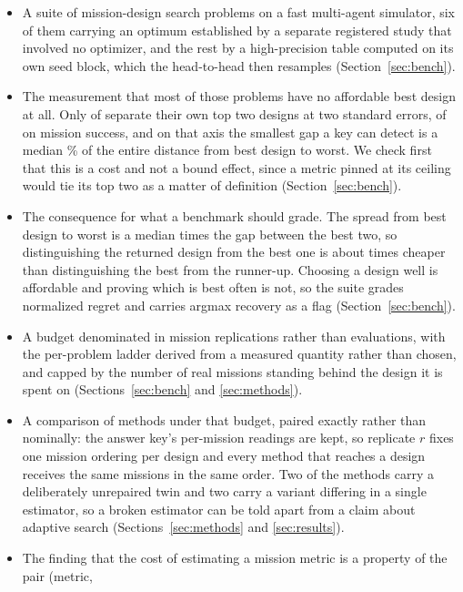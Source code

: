 \documentclass[11pt]{article}
\begin{document}
\begin{itemize}
\item A suite of mission-design search problems on a fast multi-agent simulator, six of them
      carrying an optimum established by a separate registered study that involved no optimizer, and
      the rest by a high-precision table computed on its own seed block, which the head-to-head
      then resamples (Section~\ref{sec:bench}).
\item The measurement that most of those problems have no affordable best design at all. Only
      \BnKeyResolved{} of \BnKeyProblems{} separate their own top two designs at two standard
      errors, \BnKeyResSucc{} of \BnKeyNSucc{} on mission success, and on that axis the smallest
      gap a key can detect is a median \BnKeyDetSucc{}\% of the entire distance from best design to
      worst. We check first that this is a cost and not a bound effect, since a metric pinned at
      its ceiling would tie its top two as a matter of definition (Section~\ref{sec:bench}).
\item The consequence for what a benchmark should grade. The spread from best design to worst is a
      median \BnSpreadOverGapMed{} times the gap between the best two, so distinguishing the
      returned design from the best one is about \BnCheaper{} times cheaper than distinguishing the
      best from the runner-up. Choosing a design well is affordable and proving which is best often
      is not, so the suite grades normalized regret and carries argmax recovery as a flag
      (Section~\ref{sec:bench}).
\item A budget denominated in mission replications rather than evaluations, with the per-problem
      ladder derived from a measured quantity rather than chosen, and capped by the number of real
      missions standing behind the design it is spent on (Sections~\ref{sec:bench} and
      \ref{sec:methods}).
\item A comparison of \BnMethods{} methods under that budget, paired exactly rather than nominally:
      the answer key's per-mission readings are kept, so replicate $r$ fixes one mission ordering per
      design and every method that reaches a design receives the same missions in the same order.
      Two of the methods carry a deliberately unrepaired twin and two carry a variant differing in a
      single estimator, so a broken estimator can be told apart from a claim about adaptive search
      (Sections~\ref{sec:methods} and \ref{sec:results}).
\item The finding that the cost of estimating a mission metric is a property of the pair (metric,

\end{itemize}
\end{document}
